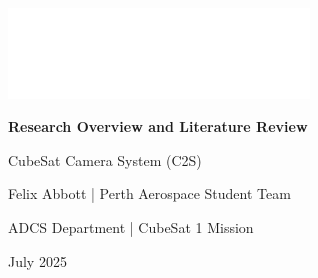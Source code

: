 \documentclass[10pt]{article}
\begin{document}
\pagecolor[HTML]{0025A9}
\begin{titlepage}
    \centering
    \color{white}
    \vspace*{2cm}
    
    \includegraphics[width=0.6\textwidth]{Images/Cover/Logo_White.png} %
    
    \vspace{2cm}
    {\LARGE\bfseries Research Overview and Literature Review\par}
    \vspace{0.5cm}
    {\Huge CubeSat Camera System (C2S)\par}
    
    \vspace{2cm}
    {\large Felix Abbott \quad | \quad Perth Aerospace Student Team\par}
    \vspace{0.25cm}
    {\large ADCS Department \quad | \quad CubeSat 1 Mission\par}
    
    \vfill
    {\large July 2025\par}
\end{titlepage}

\pagecolor{white}
\color{black}
\pagestyle{fancy}
\tableofcontents
\clearpage
\end{document}
